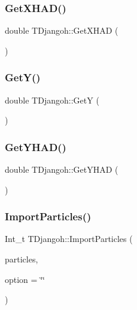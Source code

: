 \mbox{\label{class_t_djangoh_a64b580157191cf32f0b3ba4047b69bdf}} 
\subsubsection{\texorpdfstring{Get\+X\+H\+A\+D()}{GetXHAD()}}
{\footnotesize\ttfamily double T\+Djangoh\+::\+Get\+X\+H\+AD (\begin{DoxyParamCaption}{ }\end{DoxyParamCaption})\hspace{0.3cm}{\ttfamily [inline]}}

\mbox{\label{class_t_djangoh_aee089d5536e8acb68236f9546e4f06e2}} 
\subsubsection{\texorpdfstring{Get\+Y()}{GetY()}}
{\footnotesize\ttfamily double T\+Djangoh\+::\+GetY (\begin{DoxyParamCaption}{ }\end{DoxyParamCaption})\hspace{0.3cm}{\ttfamily [inline]}}

\mbox{\label{class_t_djangoh_a4cfb37ad76ec038f6e05b90341befb7f}} 
\subsubsection{\texorpdfstring{Get\+Y\+H\+A\+D()}{GetYHAD()}}
{\footnotesize\ttfamily double T\+Djangoh\+::\+Get\+Y\+H\+AD (\begin{DoxyParamCaption}{ }\end{DoxyParamCaption})\hspace{0.3cm}{\ttfamily [inline]}}

\mbox{\label{class_t_djangoh_a69e5ebe63faa2dd00d9bcd217ecdf825}} 
\subsubsection{\texorpdfstring{Import\+Particles()}{ImportParticles()}\hspace{0.1cm}{\footnotesize\ttfamily [1/2]}}
{\footnotesize\ttfamily Int\+\_\+t T\+Djangoh\+::\+Import\+Particles (\begin{DoxyParamCaption}\item[{T\+Clones\+Array $\ast$}]{particles,  }\item[{Option\+\_\+t $\ast$}]{option = {\ttfamily \char`\"{}\char`\"{}} }\end{DoxyParamCaption})}




